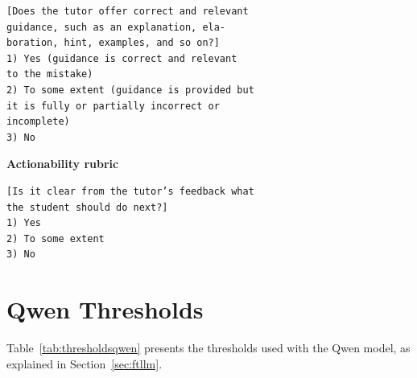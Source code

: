 \documentclass[11pt]{article}
\newcommand{\todo}[1]{\textcolor{blue}{\textbf{\small [TODO: #1]}}}
\begin{document}
\begin{verbatim}
[Does the tutor offer correct and relevant
guidance, such as an explanation, ela-
boration, hint, examples, and so on?]
1) Yes (guidance is correct and relevant
to the mistake)
2) To some extent (guidance is provided but
it is fully or partially incorrect or 
incomplete)
3) No
\end{verbatim}

\noindent\textbf{Actionability rubric}

\begin{verbatim}
[Is it clear from the tutor’s feedback what
the student should do next?]
1) Yes
2) To some extent
3) No
\end{verbatim}

\section{Qwen Thresholds}
\label{sec:appendix_thresholds}

Table~\ref{tab:thresholdsqwen} presents the thresholds used with the Qwen model, as explained in Section~\ref{sec:ftllm}.

\begin{table}[h!]
\centering
{}
\caption{Threshold-based classification rules for each evaluation dimension using Qwen. TSE = "To some extent".}
\label{tab:thresholdsqwen}
\end{table}


\end{document}
